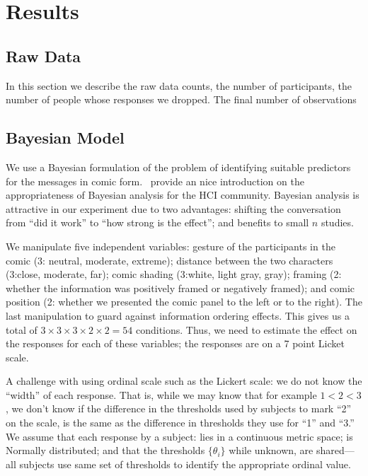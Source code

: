 
\section{Results}
\label{sec:Results}

\subsection{Raw Data}
\label{sub:Raw Data}
In this section we describe the raw data counts, the number of participants, the number of people whose responses we dropped. The final number of observations

\subsection{Bayesian Model}
\label{sub:Bayesian Model}
We use a Bayesian formulation of the problem of identifying suitable predictors for the messages in comic form.~\textcite{Kay2016} provide an nice introduction on the appropriateness of Bayesian analysis for the HCI community. Bayesian analysis is attractive in our experiment due to two advantages: shifting the conversation from ``did it work'' to ``how strong is the effect''; and benefits to small $n$ studies.

We manipulate five independent variables: gesture of the participants in the comic (3: neutral, moderate, extreme);  distance between the two characters (3:close, moderate, far); comic shading (3:white, light gray, gray); framing (2: whether the information was positively framed or negatively framed); and comic position (2: whether we presented the comic panel to the left or to the right). The last manipulation to guard against information ordering effects. This gives us a total of $3 \times 3 \times 3 \times 2 \times 2 = 54$ conditions. Thus, we need to estimate the effect on the responses for each of these variables; the responses are on a 7 point Licket scale.

A challenge with using ordinal scale such as the Lickert scale: we do not know the ``width'' of each response. That is, while we may know that for example $1<2<3$, we don't know if the difference in the thresholds used by subjects to mark ``2'' on the scale, is the same as the difference in thresholds they use for ``1'' and ``3.''  We assume that each response by a subject: lies in a continuous metric space; is Normally distributed; and that the thresholds $\{\theta_i\}$ while unknown, are shared—all subjects use same set of thresholds to identify the appropriate ordinal value.

